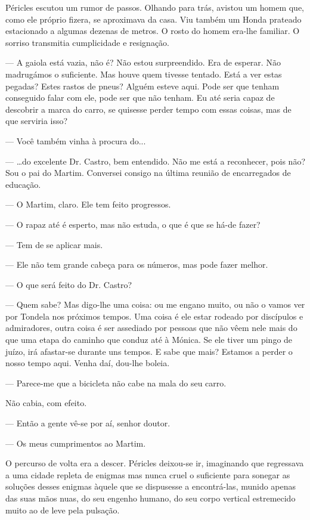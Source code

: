 Péricles escutou um rumor de passos. Olhando para trás, avistou um homem
que, como ele próprio fizera, se aproximava da casa. Viu também um
Honda prateado estacionado a algumas dezenas de metros. O rosto do homem
era-lhe familiar. O sorriso transmitia cumplicidade e resignação.

--- A gaiola está vazia, não é? Não estou surpreendido. Era de esperar.
  Não madrugámos o suficiente. Mas houve quem tivesse tentado. Está a
  ver estas pegadas? Estes rastos de pneus? Alguém esteve aqui. Pode ser
  que tenham conseguido falar com ele, pode ser que não tenham. Eu até
  seria capaz de descobrir a marca do carro, se quisesse perder tempo
  com essas coisas, mas de que serviria isso?

--- Você também vinha à procura do...

--- \ldots{}do excelente Dr. Castro, bem entendido. Não me
está a reconhecer, pois não? Sou o pai do Martim. Conversei consigo na
última reunião de encarregados de educação.

--- O Martim, claro. Ele tem feito progressos.

--- O rapaz até é esperto, mas não estuda, o que é que se há-de fazer?

--- Tem de se aplicar mais.

--- Ele não tem grande cabeça para os números, mas pode fazer melhor.

--- O que será feito do Dr. Castro?

--- Quem sabe? Mas digo-lhe uma coisa: ou me engano muito, ou não o vamos
  ver por Tondela nos próximos tempos. Uma coisa é ele estar rodeado por
  discípulos e admiradores, outra coisa é ser assediado por pessoas que
  não vêem nele mais do que uma etapa do caminho que conduz até à
  Mónica. Se ele tiver um pingo de juízo, irá afastar-se durante uns
  tempos. E sabe que mais? Estamos a perder o nosso tempo aqui. Venha
  daí, dou-lhe boleia.

--- Parece-me que a bicicleta não cabe na mala do seu carro.


Não cabia, com efeito.

--- Então a gente vê-se por aí, senhor doutor.

--- Os meus cumprimentos ao Martim.


O percurso de volta era a descer. Péricles deixou-se ir, imaginando
que regressava a uma cidade repleta de enigmas mas nunca cruel o
suficiente para sonegar as soluções desses enigmas àquele que se
dispusesse a encontrá-las, munido apenas das suas mãos nuas, do seu
engenho humano, do seu corpo vertical estremecido muito ao de leve pela
pulsação.

